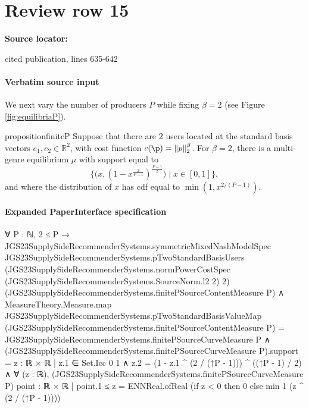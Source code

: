 \documentclass[10pt]{article}
\begin{document}
\section*{Review row 15}
\textbf{Source locator:} {\footnotesize\raggedright cited publication, lines 635-\allowbreak{}642\par}
\paragraph{Verbatim source input}
\begin{ReviewVerbatim}
We next vary the number of producers $P$ while fixing $\beta = 2$ (see Figure \ref{fig:equilibriaP}). \begin{restatable}{proposition}{finiteP}
\label{prop:finiteP}
Suppose that there are 2 users located at the standard basis vectors $e_1, e_2 \in \mathbb{R}^2$, with cost function $c(\p) = \|p\|_2^{\beta}$. For $\beta = 2$, there is a multi-genre equilibrium $\mu$ with support equal to
\begin{equation}
\big\{\big(x, (1 -  x^{\frac{2}{P-1}})^{\frac{P-1}{2}}\big) \mid x \in [0,1] \big\},
\end{equation}
and where the distribution of $x$ has cdf equal to $\min(1, x^{2/(P-1)})$.
\end{restatable}
\end{ReviewVerbatim}



\paragraph{Expanded PaperInterface specification}
\begin{ReviewVerbatim}
∀ {P : ℕ},
  2 ≤ P →
    JGS23SupplySideRecommenderSystems.symmetricMixedNashModelSpec
        JGS23SupplySideRecommenderSystems.pTwoStandardBasisUsers
        (JGS23SupplySideRecommenderSystems.normPowerCostSpec (JGS23SupplySideRecommenderSystems.SourceNorm.l2 2) 2)
        (JGS23SupplySideRecommenderSystems.finitePSourceContentMeasure P) ∧
      MeasureTheory.Measure.map JGS23SupplySideRecommenderSystems.pTwoStandardBasisValueMap
            (JGS23SupplySideRecommenderSystems.finitePSourceContentMeasure P) =
          JGS23SupplySideRecommenderSystems.finitePSourceCurveMeasure P ∧
        (JGS23SupplySideRecommenderSystems.finitePSourceCurveMeasure P).support =
            {z : ℝ × ℝ | z.1 ∈ Set.Icc 0 1 ∧ z.2 = (1 - z.1 ^ (2 / (↑P - 1))) ^ ((↑P - 1) / 2)} ∧
          ∀ (z : ℝ),
            (JGS23SupplySideRecommenderSystems.finitePSourceCurveMeasure P) {point : ℝ × ℝ | point.1 ≤ z} =
              ENNReal.ofReal (if z < 0 then 0 else min 1 (z ^ (2 / (↑P - 1))))
\end{ReviewVerbatim}
\end{document}
